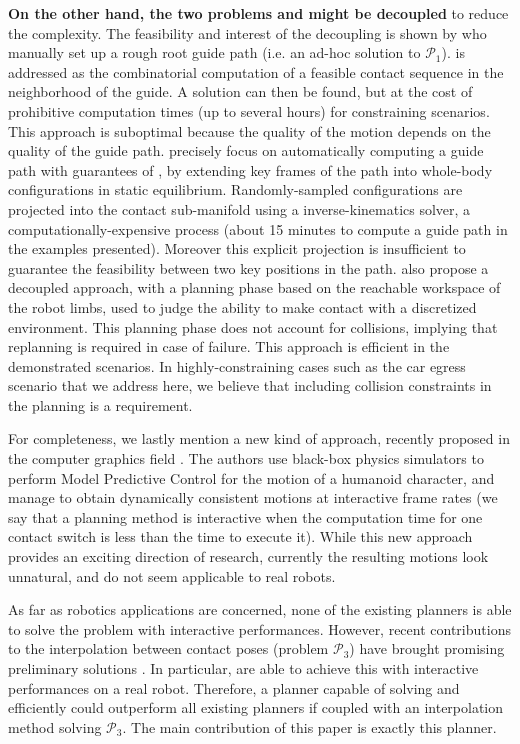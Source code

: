 \textbf{On the other hand, the two problems \Pa and \Pb might be decoupled} to reduce the complexity. The feasibility and interest of the decoupling is shown by \citeauthor{DBLP:conf/iser/EscandeKMG08} who manually set up a rough root guide path (i.e. an ad-hoc solution to $\mathcal{P}_1$). \Pb is addressed as the combinatorial computation of a feasible contact sequence in the neighborhood of the guide. A solution can then be found, %
but at the cost of prohibitive computation times (up to several hours) for constraining scenarios. This approach is suboptimal because the quality of the motion depends on the quality of the guide path. \citeauthor{Bouyarmane2009} precisely focus on automatically computing a guide path with guarantees of , by extending key frames of the path into whole-body configurations in static equilibrium. Randomly-sampled configurations are projected into the contact sub-manifold using a inverse-kinematics solver, a computationally-expensive process (about 15 minutes to compute a guide path in the examples presented). Moreover this explicit projection is insufficient to guarantee the feasibility between two key positions in the path. \citeauthor{7140082} also propose a decoupled approach, with a planning phase based on the reachable workspace of the robot limbs, used to judge the ability to make contact with 
a discretized environment. This planning phase does not account for collisions, implying that replanning is required in case of failure. This approach is efficient 
in the demonstrated scenarios. In highly-constraining cases such 
as the car egress scenario that we address here, we believe that including collision constraints in the planning is a requirement.

For completeness, we lastly mention a new kind of approach, recently proposed in the computer graphics field \citep{hamalainen_cpbp_2015}. The authors
use black-box physics simulators to perform Model Predictive Control for the motion of a humanoid character, and manage to obtain dynamically consistent motions
at \gls{interactive} frame rates (we say that a planning method is interactive when the computation time for one contact switch is less than the
time to execute it). While this new approach provides an exciting direction of research, currently the resulting motions
look unnatural, and do not seem applicable to real robots.

As far as robotics applications are concerned, none of the existing planners is able to solve the problem with \gls{interactive} performances.
However, recent contributions to the interpolation between contact poses (problem $\mathcal{P}_3$) have brought promising preliminary solutions \citep{Hauser2014, herzog2015trajectory, Park116, Carpentier2016}. In particular, \citeauthor{Carpentier2016} are able to achieve this with \gls{interactive} performances on a real robot.
Therefore, a planner capable of solving \Pa and \Pb efficiently could outperform all existing planners if coupled with an interpolation method solving $\mathcal{P}_3$.
The main contribution of this paper is exactly this planner.

